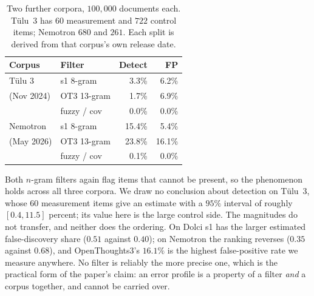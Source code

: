 \documentclass[11pt]{article}
\begin{document}
\begin{table}[h]
\centering
\small
\setlength{\tabcolsep}{4pt}
\begin{tabular}{llrr}
\toprule
\textbf{Corpus} & \textbf{Filter} & \textbf{Detect} & \textbf{FP} \\
\midrule
T\"{u}lu 3    & s1 8-gram   & 3.3\%  & 6.2\% \\
(Nov 2024) & OT3 13-gram & 1.7\%  & 6.9\% \\
           & fuzzy / cov & 0.0\%  & 0.0\% \\
\midrule
Nemotron   & s1 8-gram   & 15.4\% & 5.4\% \\
(May 2026) & OT3 13-gram & 23.8\% & 16.1\% \\
           & fuzzy / cov & 0.1\%  & 0.0\% \\
\bottomrule
\end{tabular}
\caption{Two further corpora, $100{,}000$ documents each. T\"{u}lu~3 has $60$
measurement and $722$ control items; Nemotron $680$ and $261$. Each split is
derived from that corpus's own release date.}
\label{tab:nemotron}
\end{table}

Both $n$-gram filters again flag items that cannot be present, so the phenomenon
holds across all three corpora. We draw no conclusion about detection on
T\"{u}lu~3, whose $60$ measurement items give an estimate with a $95\%$ interval of
roughly $[0.4, 11.5]$ percent; its value here is the large control side. The
magnitudes do not transfer, and neither does the ordering. On Dolci s1 has the larger estimated false-discovery share
($0.51$ against $0.40$); on Nemotron the ranking reverses
($0.35$ against $0.68$), and OpenThoughts3's $16.1\%$ is the highest
false-positive rate we measure anywhere. No filter is reliably the more precise
one, which is the practical form of the paper's claim: an error profile is a
property of a filter \emph{and} a corpus together, and cannot be carried over.
\end{document}
